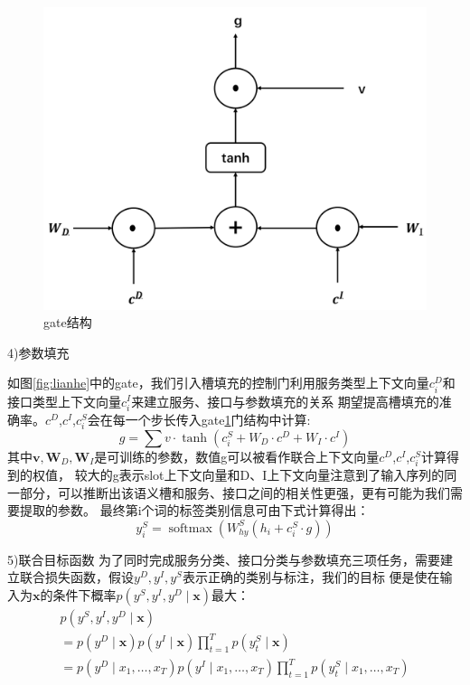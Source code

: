       \begin{figure}[htbp]
        \centering
        \includegraphics[scale=0.3]{./images/gate.jpg}
        \caption{gate结构}
        \label{fig:gate}
      \end{figure}

4)参数填充

如图\ref{fig:lianhe}中的gate，我们引入槽填充的控制门利用服务类型上下文向量${c}_{i}^{D}$和接口类型上下文向量${c}_{i}^{I}$来建立服务、接口与参数填充的关系
期望提高槽填充的准确率。${c}^{D}$,${c}^{I}$,${c}_{i}^{S}$会在每一个步长传入gate\ref{fig:gate}门结构中计算:
\begin{equation}
    g=\sum v \cdot \tanh (c_{i}^{S}+W_D \cdot c^{D}+W_I \cdot c^{I})
  \end{equation}
其中$\mathbf{v},\mathbf{W}_D,\mathbf{W}_I$是可训练的参数，数值g可以被看作联合上下文向量${c}^{D}$,${c}^{I}$,${c}_{i}^{S}$计算得到的权值，
较大的g表示slot上下文向量和D、I上下文向量注意到了输入序列的同一部分，可以推断出该语义槽和服务、接口之间的相关性更强，更有可能为我们需要提取的参数。
最终第i个词的标签类别信息可由下式计算得出：
\begin{equation}
    y_{i}^{S}=\operatorname{softmax}\left(W_{h y}^{S}\left(h_{i}+c_{i}^{S} \cdot g\right)\right)
  \end{equation}

5)联合目标函数
为了同时完成服务分类、接口分类与参数填充三项任务，需要建立联合损失函数，假设$y^D,y^I,y^S$表示正确的类别与标注，我们的目标
便是使在输入为$\mathbf{x}$的条件下概率$p\left(y^{S}, y^{I},y^{D} \mid \mathbf{x}\right)$最大：
\begin{equation}
    \begin{array}{l}
        p\left(y^{S}, y^{I},y^{D} \mid \mathbf{x}\right) \\
        =p\left(y^{D} \mid \mathbf{x}\right) p\left(y^{I} \mid \mathbf{x}\right) \prod_{t=1}^{T} p\left(y_{t}^{S} \mid \mathbf{x}\right) \\
        =p(y^{D} \mid x_{1}, \ldots, x_{T}) p(y^{I} \mid x_{1}, \ldots, x_{T}) \prod_{t=1}^{T} p(y_{t}^{S} \mid x_{1}, \ldots, x_{T})
        \end{array}
    \end{equation}

